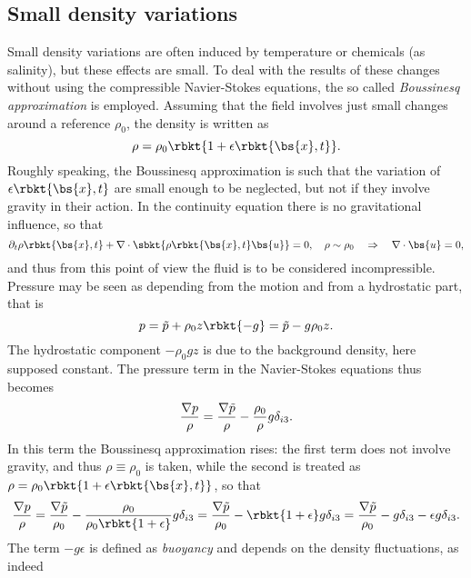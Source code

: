 \subsection{Small density variations}
Small density variations are often induced by temperature or chemicals (as salinity), but these effects are small. To deal with the results of these changes without using the compressible Navier-Stokes equations, the so called \emph{Boussinesq approximation} is employed. Assuming that the field involves just small changes around a reference $\rho_{0}$, the density is written as
\begin{equation*}
    \rho = \rho_{0}\rbkt{1 + \epsilon\rbkt{\bs{x},t}}.
\end{equation*}
Roughly speaking, the Boussinesq approximation is such that the variation of $\epsilon\rbkt{\bs{x},t}$ are small enough to be neglected, but not if they involve gravity in their action. In the continuity equation there is no gravitational influence, so that 
\begin{equation*}
    \partial_{t}\rho\rbkt{\bs{x},t} + \nabla\cdot\sbkt{\rho\rbkt{\bs{x},t}\bs{u} } = 0, \quad \rho\sim\rho_{0}  \quad\Rightarrow \quad \nabla\cdot\bs{u}=0,
\end{equation*}
and thus from this point of view the fluid is to be considered incompressible. Pressure may be seen as depending from the motion and from a hydrostatic part, that is 
\begin{equation}
    p = \Tilde{p} + \rho_{0}z\rbkt{-g}=\Tilde{p}-g\rho_{0}z.
\end{equation}
The hydrostatic component $-\rho_{0}gz$ is due to the background density, here supposed constant. The pressure term in the Navier-Stokes equations thus becomes
\begin{equation*}
    \dfrac{\nabla p}{\rho} = \dfrac{\nabla \Tilde{p}}{\rho} - \dfrac{\rho_{0}}{\rho}g\delta_{i3}.
\end{equation*}
In this term the Boussinesq approximation rises: the first term does not involve gravity, and thus $\rho\equiv\rho_{0}$ is taken, while the second is treated as $\rho = \rho_{0}\rbkt{1 + \epsilon\rbkt{\bs{x},t}}$, so that
\begin{equation*}
    \dfrac{\nabla p}{\rho} = \dfrac{\nabla \Tilde{p}}{\rho_{0}} - \dfrac{\rho_{0}}{\rho_{0}\rbkt{1 + \epsilon}}g\delta_{i3}= \dfrac{\nabla \Tilde{p}}{\rho_{0}} - \rbkt{1 + \epsilon}g\delta_{i3}=\dfrac{\nabla \Tilde{p}}{\rho_{0}} - g\delta_{i3} - \epsilon g\delta_{i3}.
\end{equation*}
The term $-g\epsilon$ is defined as \emph{buoyancy} and depends on the density fluctuations, as indeed
